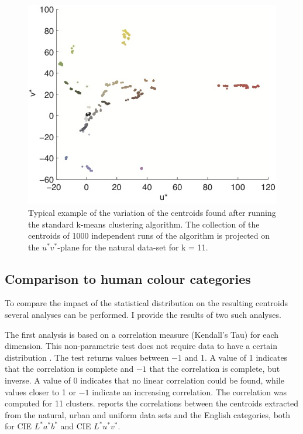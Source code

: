 \begin{figure}[htbp]
\centering
\includegraphics[width=.7\textwidth]{./experiments/figures/clustering-first.jpg}
\caption[Example of the variation of the centroids found by the
k-means clustering algorithm]{Typical example of the variation of the
  centroids found after running the standard k-means clustering
  algorithm. The collection of the centroids of 1000 independent runs
  of the algorithm is projected on the $u^*v^*$-plane for the natural
  data-set for k = 11.}
\label{f:clustering-first}
\end{figure}

\subsection{Comparison to human colour categories}

To compare the impact of the statistical distribution on the resulting
centroids several analyses can be performed. I provide the results of
two such analyses.

The first analysis is based on a correlation measure (Kendall's Tau)
for each dimension. This non-parametric test does not require data to
have a certain distribution \citep{conover99practical}. The test
returns values between $-1$ and 1. A value of 1 indicates that the
correlation is complete and $-1$ that the correlation is complete, but
inverse. A value of 0 indicates that no linear correlation could be
found, while values closer to 1 or $-1$ indicate an increasing
correlation. The correlation was computed for 11 clusters.  reports the correlations between the
centroids extracted from the natural, urban and uniform data sets and
the English categories, both for CIE $L^*a^*b^*$ and CIE $L^*u^*v^*$.

